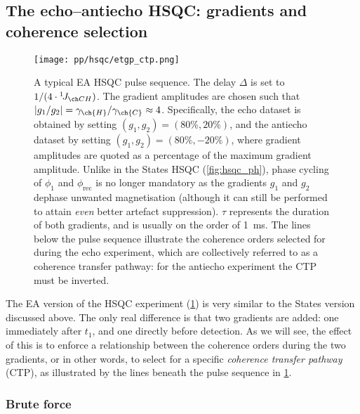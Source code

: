 \subsection{The echo--antiecho HSQC: gradients and coherence selection}
\label{subsec:theory__hsqc_ea}

\begin{figure}[!ht]
    \centering
    \texttt{[image: pp/hsqc/etgp\_ctp.png]}%
    \caption[Echo--antiecho HSQC pulse sequence]{
        A typical EA HSQC pulse sequence.
        The delay $\Delta$ is set to $1/(4 \cdot \oneJ{CH})$.
        The gradient amplitudes are chosen such that $|g_1/g_2| = \gamma_{\ch{H}}/\gamma_{\ch{C}} \approx 4$.
        Specifically, the echo dataset is obtained by setting $(g_1, g_2) = (80\%, 20\%)$, and the antiecho dataset by setting $(g_1, g_2) = (80\%, -20\%)$, where gradient amplitudes are quoted as a percentage of the maximum gradient amplitude.
        Unlike in the States HSQC (\cref{fig:hsqc_ph}), phase cycling of $\phi_1$ and $\phi_\text{rec}$ is no longer mandatory as the gradients $g_1$ and $g_2$ dephase unwanted magnetisation (although it can still be performed to attain \textit{even} better artefact suppression).
        $\tau$ represents the duration of both gradients, and is usually on the order of \qty{1}{ms}.
        The lines below the pulse sequence illustrate the coherence orders selected for during the echo experiment, which are collectively referred to as a coherence transfer pathway: for the antiecho experiment the \carbon{} CTP must be inverted.
    }
    \label{fig:hsqc_etgp}
\end{figure}

The EA version of the HSQC experiment (\cref{fig:hsqc_etgp}) is very similar to the States version discussed above.
The only real difference is that two gradients are added: one immediately after $t_1$, and one directly before detection.
As we will see, the effect of this is to enforce a relationship between the coherence orders during the two gradients, or in other words, to select for a specific \textit{coherence transfer pathway} (CTP), as illustrated by the lines beneath the pulse sequence in \cref{fig:hsqc_etgp}.


\subsubsection{Brute force}

